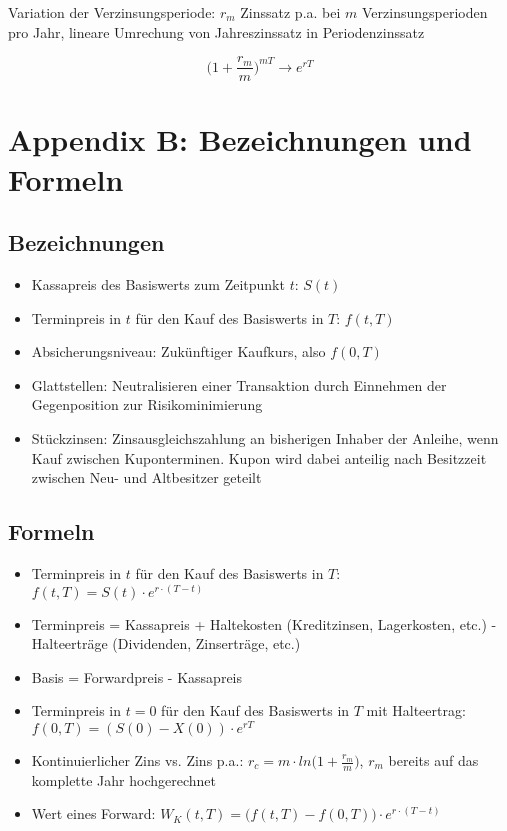 Variation der Verzinsungsperiode: \(r_m\) Zinssatz p.a. bei \(m\) Verzinsungsperioden pro Jahr, lineare Umrechung von Jahreszinssatz in Periodenzinssatz

\[\Big(1+\frac{r_m}{m}\Big)^{mT} \longrightarrow e^{rT}\]


\section{Appendix B: Bezeichnungen und Formeln}

\subsection{Bezeichnungen}
\begin{itemize}
	\item Kassapreis des Basiswerts zum Zeitpunkt \(t\): \(S(t)\)
	\item Terminpreis in \(t\) für den Kauf des Basiswerts in \(T\): \(f(t,T)\)
	\item Absicherungsniveau: Zukünftiger Kaufkurs, also \(f(0,T)\)
	\item Glattstellen: Neutralisieren einer Transaktion durch Einnehmen der Gegenposition zur Risikominimierung
	\item Stückzinsen: Zinsausgleichszahlung an bisherigen Inhaber der Anleihe, wenn Kauf zwischen Kuponterminen. Kupon wird dabei anteilig nach Besitzzeit zwischen Neu- und Altbesitzer geteilt 
\end{itemize}


\subsection{Formeln}
\begin{itemize}
	\item Terminpreis in \(t\) für den Kauf des Basiswerts in \(T\): \(f(t,T) = S(t)\cdot e^{r\cdot (T-t)}\)
	\item Terminpreis = Kassapreis + Haltekosten (Kreditzinsen, Lagerkosten, etc.) - Halteerträge (Dividenden, Zinserträge, etc.)
	\item Basis = Forwardpreis - Kassapreis
	\item Terminpreis in \(t=0\) für den Kauf des Basiswerts in \(T\) mit Halteertrag: \(f(0,T) = (S(0)-X(0))\cdot e^{rT}\)
	\item Kontinuierlicher Zins vs. Zins p.a.: \(r_c = m \cdot ln\Big(1+\frac{r_m}{m}\Big)\), \(r_m\) bereits auf das komplette Jahr hochgerechnet
	\item Wert eines Forward: \(W_K(t,T) = \Big(f(t,T)-f(0,T)\Big) \cdot e^{r\cdot (T-t)}\)
\end{itemize}

